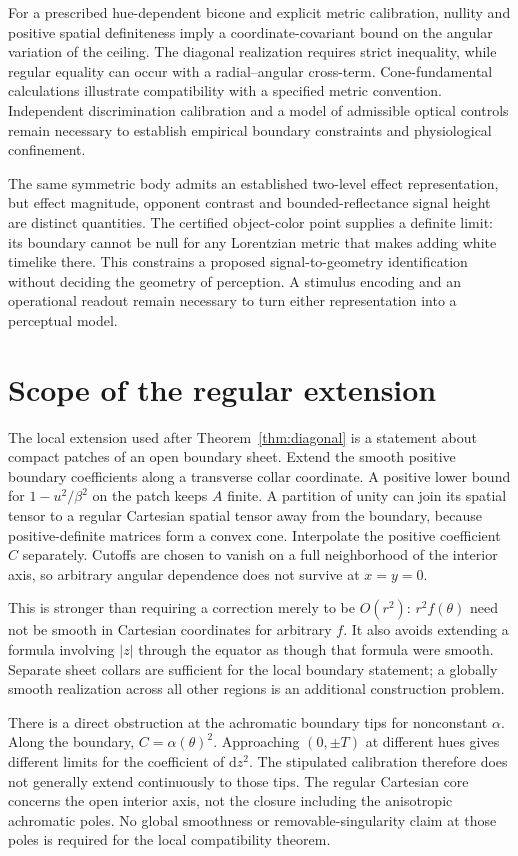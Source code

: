 \documentclass[11pt,letterpaper]{article}
\theoremstyle{plain}
\newcommand{\dd}{\mathrm{d}}
\begin{document}
For a prescribed hue-dependent bicone and explicit metric calibration, nullity and positive spatial definiteness imply a coordinate-covariant bound on the angular variation of the ceiling. The diagonal realization requires strict inequality, while regular equality can occur with a radial--angular cross-term. Cone-fundamental calculations illustrate compatibility with a specified metric convention. Independent discrimination calibration and a model of admissible optical controls remain necessary to establish empirical boundary constraints and physiological confinement.

The same symmetric body admits an established two-level effect representation, but effect magnitude, opponent contrast and bounded-reflectance signal height are distinct quantities. The certified object-color point supplies a definite limit: its boundary cannot be null for any Lorentzian metric that makes adding white timelike there. This constrains a proposed signal-to-geometry identification without deciding the geometry of perception. A stimulus encoding and an operational readout remain necessary to turn either representation into a perceptual model.

\appendix
\section{Scope of the regular extension}
\label{app:extension}
The local extension used after Theorem~\ref{thm:diagonal} is a statement about compact patches of an open boundary sheet. Extend the smooth positive boundary coefficients along a transverse collar coordinate. A positive lower bound for $1-u^2/\beta^2$ on the patch keeps $A$ finite. A partition of unity can join its spatial tensor to a regular Cartesian spatial tensor away from the boundary, because positive-definite matrices form a convex cone. Interpolate the positive coefficient $C$ separately. Cutoffs are chosen to vanish on a full neighborhood of the interior axis, so arbitrary angular dependence does not survive at $x=y=0$.

This is stronger than requiring a correction merely to be $O(r^2)$: $r^2f(\theta)$ need not be smooth in Cartesian coordinates for arbitrary $f$. It also avoids extending a formula involving $|z|$ through the equator as though that formula were smooth. Separate sheet collars are sufficient for the local boundary statement; a globally smooth realization across all other regions is an additional construction problem.

There is a direct obstruction at the achromatic boundary tips for nonconstant $\alpha$. Along the boundary, $C=\alpha(\theta)^2$. Approaching $(0,\pm T)$ at different hues gives different limits for the coefficient of $\dd z^2$. The stipulated calibration therefore does not generally extend continuously to those tips. The regular Cartesian core concerns the open interior axis, not the closure including the anisotropic achromatic poles. No global smoothness or removable-singularity claim at those poles is required for the local compatibility theorem.
\end{document}
